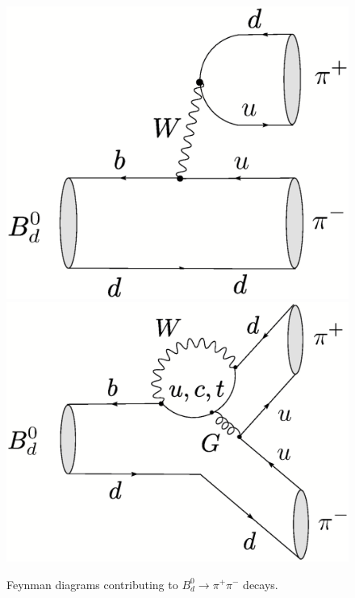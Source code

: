 \documentclass[12pt]{article}
\begin{document}
\begin{figure}
\centerline{
 \includegraphics[width=4.5truecm]{B0dtopipi-tree.ps}
 \hspace*{0.5truecm}
 \includegraphics[width=5.2truecm]{B0dtopipi-pen.ps}  
 }
 \vspace*{-0.3truecm}
\caption{Feynman diagrams contributing to $B^0_d\to \pi^+\pi^-$ 
decays.}\label{fig:Bpipi-diag}
\end{figure}
\end{document}
